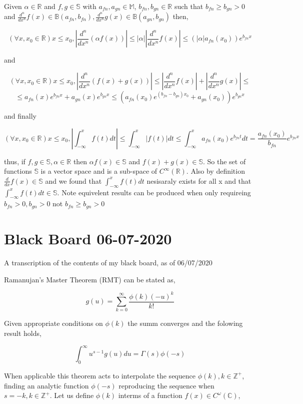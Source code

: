 \documentclass[%
 preprint,
 amsmath, amssymb, aps, pra, 10pt
]{revtex4-2}
\begin{document}
Given $\alpha \in \mathbb{R}$ and $f, g \in \mathbb{S}$ with $a_{fn}, a_{gn} \in \mathbb{M}$, $ b_{fn}, b_{gn} \in \mathbb{R}$ such that $b_{fn} \geq b_{gn} > 0$ and $\frac{d^n}{dx^n} f(x) \in \mathbb{B}(a_{fn}, b_{fn}), \frac{d^n}{dx^n} g(x) \in \mathbb{B}(a_{gn}, b_{gn})$ then,

\[(\forall x, x_0 \in \mathbb{R}) x \leq x_0, \left|\frac{d^n}{dx^n} (\alpha f(x))\right| \leq |\alpha| \left|\frac{d^n}{dx^n}f(x)\right| \leq (|\alpha| a_{fn}(x_0))e^{b_{fn}x}\]

and

\[(\forall x, x_0 \in \mathbb{R}) x \leq x_0, \left|\frac{d^n}{dx^n}(f(x) + g(x))\right| \leq \left|\frac{d^n}{dx^n} f(x)\right| + \left|\frac{d^n}{dx^n} g(x)\right| \leq \]
\[\leq a_{fn}(x)e^{b_{fn}x} + a_{gn}(x)e^{b_{gn}x} \leq \left(a_{fn}(x_0)e^{(b_{fn} - b_{gn})x_0} + a_{gn}(x_0)\right)e^{b_{gn}x}\]

and finally

\[(\forall x, x_0 \in \mathbb{R}) x \leq x_0, \left|\int_{-\infty}^x f(t)dt\right| \leq \int_{-\infty}^x \left|f(t)\right| dt \leq \int_{-\infty}^x a_{fn}(x_0)e^{b_{fn}t}dt = \frac{a_{fn}(x_0)}{b_{fn}}e^{b_{fn}x}\]

thus, if $f, g \in \mathbb{S}, \alpha \in \mathbb{R}$ then $\alpha f(x) \in \mathbb{S}$ and $f(x) + g(x) \in \mathbb{S}$. So the set of functions $\mathbb{S}$ is a vector space and is a sub-space of $C^\infty(\mathbb{R})$. Also by definition $\frac{d}{dx}f(x) \in \mathbb{S}$ and we found that $\int_{-\infty}^x f(t)dt$ nesisaraly exists for all x and that $\int_{-\infty}^x f(t)dt \in \mathbb{S}$. Note equivelent results can be produced when only requireing $b_{fn}>0, b_{gn}>0$ not $b_{fn}\geq b_{gn} > 0$

\section{Black Board 06-07-2020}

A transcription of the contents of my black board, as of 06/07/2020

Ramanujan's Master Theorem (RMT) can be stated as,

\[g(u) = \sum_{k=0}^\infty \frac{\phi(k)(-u)^k}{k!}\]

Given appropriate conditions on $\phi(k)$ the summ converges and the folowing result holds,

\[\int_0^{\infty} u^{s-1}g(u)du = \Gamma(s)\phi(-s)\]

When applicable this theorem acts to interpolate the sequence $\phi(k), k \in \mathbb{Z}^+$, finding an analytic function $\phi(-s)$ reproducing the sequence when $s = -k, k \in \mathbb{Z}^+$. Let us define $\phi(k)$ interms of a function $f(x) \in C^{\omega}(\mathbb{C})$,
\end{document}
